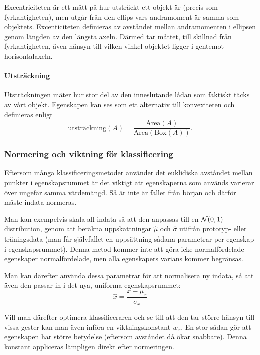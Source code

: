 \documentclass[../rapport_MVEX01-11-05]{subfiles}
\begin{document}
Excentriciteten är ett mått på hur utsträckt ett objekt är (precis som
fyrkantigheten), men utgår från den ellips
vars andramoment är samma som objektets. Excenticiteten definieras av avståndet
mellan andramomenten i ellipsen genom längden av den längsta axeln. Därmed
tar måttet, till skillnad från fyrkantigheten, även hänsyn till vilken vinkel
objektet ligger i gentemot horisontalaxeln.

\paragraph{Utsträckning}

Utsträckningen mäter hur stor del av den inneslutande lådan som
faktiskt täcks av vårt objekt. Egenskapen kan ses som ett alternativ
till konvexiteten och definieras enligt
\begin{equation*}
  \textrm{utsträckning}(A) =
  \frac{\textrm{Area}(A)}{\textrm{Area}(\textrm{Box}(A))}.
\end{equation*}

\subsubsection{Normering och viktning för klassificering}

Eftersom många klassificeringsmetoder använder det euklidiska avståndet mellan punkter i 
egenskapsrummet är det viktigt att egenskaperna som används varierar över
ungefär samma värdemängd. Så är inte är fallet från början och därför måste indata
normeras.

Man kan exempelvis skala all indata så att den anpassas till en $\mathcal{N}(0,1)$-distribution, genom att beräkna uppskattningar $\hat\mu$ och $\hat\sigma$
utifrån prototyp- eller träningsdata (man får självfallet en uppsättning sådana
parametrar per egenskap i egenskapsrummet). Denna metod kommer inte
att göra icke normalfördelade egenskaper normalfördelade, men alla
egenskapers varians kommer begränsas.

Man kan därefter använda dessa parametrar för att normalisera ny indata, så
att även den passar in i det nya, uniforma egenskapsrummet:
\begin{equation*}
	\hat{x} = \frac{x - \mu_x}{\sigma_x}
\end{equation*}

Vill man därefter optimera klassificeraren och se till att den tar större hänsyn
till vissa gester kan man även införa en viktningskonstant $w_x$. En stor
sådan gör att egenskapen har större betydelse (eftersom avståndet då ökar
snabbare). Denna konstant appliceras lämpligen direkt efter normeringen.
\end{document}
